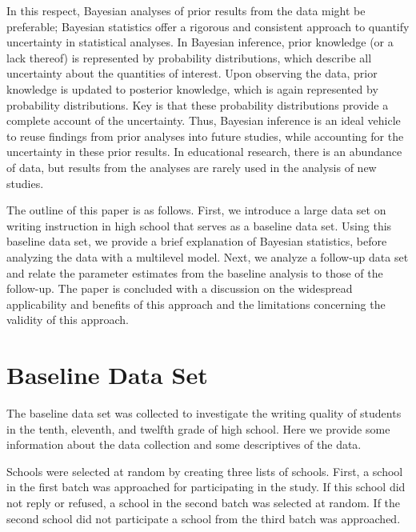 \documentclass[a4paper]{article}
\newcommand{\DON}	[1] 	{}
\begin{document}
In this respect, Bayesian analyses of prior results from the data might be preferable; Bayesian statistics offer a rigorous and consistent approach to quantify uncertainty in statistical analyses. In Bayesian inference, prior knowledge (or a lack thereof) is represented by probability distributions, which describe all uncertainty about the quantities of interest. Upon observing the data, prior knowledge is updated to posterior knowledge, which is again represented by probability distributions. Key is that these probability distributions provide a complete account of the uncertainty. Thus, Bayesian inference is an ideal vehicle to reuse findings from prior analyses into future studies, while accounting for the uncertainty in these prior results. In educational research, there is an abundance of data, but results from the analyses are rarely used in the analysis of new studies.

The outline of this paper is as follows. 
First, we introduce a large data set on writing instruction in high school that serves as a baseline data set. 
Using this baseline data set, we provide a brief explanation of Bayesian statistics, before analyzing the data with a multilevel model. 
Next, we analyze a follow-up data set and relate the parameter estimates from the baseline analysis to those of the follow-up. 
The paper is concluded with a discussion on the widespread applicability and benefits of this approach and the limitations concerning the validity of this approach.



\section*{Baseline Data Set}
\noindent The baseline data set was collected to investigate the writing quality of students in the tenth, eleventh, and twelfth grade of high school. Here we provide some information about the data collection and some descriptives of the data.

Schools were selected at random by creating three lists of schools. First, a school in the first batch was approached for participating in the study. If this school did not reply or refused, a school in the second batch was selected at random. If the second school did not participate a school from the third batch was approached.
\end{document}
